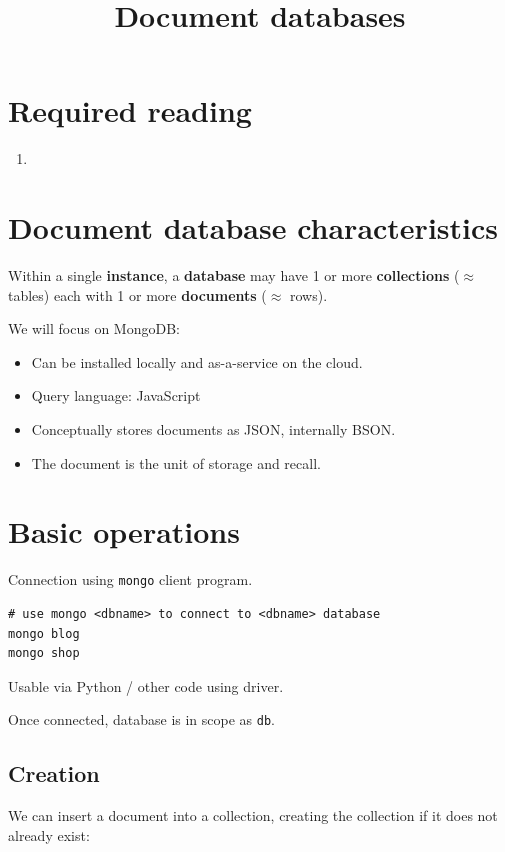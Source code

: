 \documentclass[slides]{pgnotes}
\title{Document databases}
\begin{document}
\maketitle

\section*{Required reading}

\begin{enumerate}
\item \citet[Chapter 3]{perkins:2018:seven}
\end{enumerate}

\section{Document database characteristics}

Within a single \textbf{instance}, a \textbf{database} may have 1 or more \textbf{collections} ($\approx$ tables) each with 1 or more \textbf{documents} ($\approx$ rows).


We will focus on MongoDB:
\begin{itemize}
\item Can be installed locally and as-a-service on the cloud.
\item Query language: JavaScript
\item Conceptually stores documents as JSON, internally BSON.
\item The document is the unit of storage and recall.
\end{itemize}


\section{Basic operations}

Connection using \texttt{mongo} client program.
\begin{verbatim}
# use mongo <dbname> to connect to <dbname> database
mongo blog 
mongo shop 
\end{verbatim}
Usable via Python / other code using driver.

Once connected, database is in scope as \texttt{db}.

\subsection{Creation}

We can insert a document into a collection, creating the collection if it does not already exist:
\end{document}

